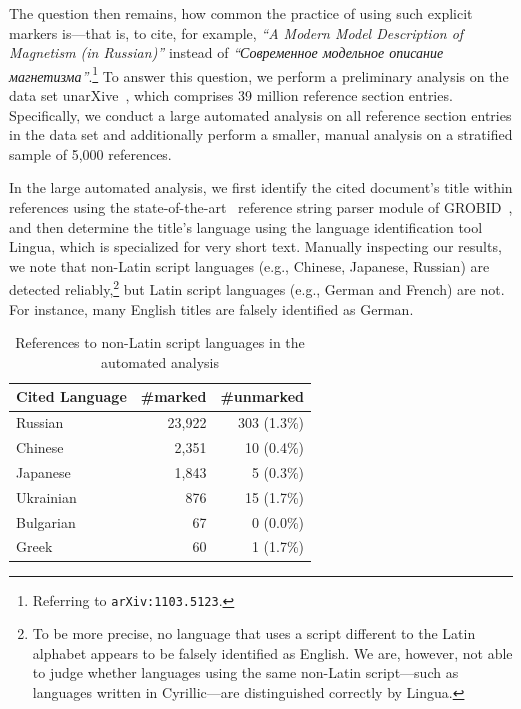 The question then remains, how common the practice of using such explicit markers is---that is, to cite, for example, \textit{``A Modern Model Description of Magnetism (in Russian)''} instead of \textit{``\foreignlanguage{russian}{Современное модельное описание магнетизма}''}.\footnote{Referring to \texttt{arXiv:1103.5123}.} To answer this question, we perform a preliminary analysis on the data set unarXive~\cite{Saier2020}, which comprises 39 million reference section entries. Specifically, we conduct a large automated analysis on all reference section entries in the data set and additionally perform a smaller, manual analysis on a stratified sample of 5,000 references.

In the large automated analysis, we first identify the cited document's title within references using the state-of-the-art~\cite{Tkaczyk2018} reference string parser module of GROBID~\cite{Lopez2009}, and then determine the title's language using the language identification tool Lingua, which is specialized for very short text.
Manually inspecting our results, we note that non-Latin script languages (e.g., Chinese, Japanese, Russian) are detected reliably,\footnote{To be more precise, no language that uses a script different to the Latin alphabet appears to be falsely identified as English. We are, however, not able to judge whether languages using the same non-Latin script---such as languages written in Cyrillic---are distinguished correctly by Lingua.} but Latin script languages (e.g., German and French) are not. For instance, many English titles are falsely identified as German.

\begin{table}
\caption{References to non-Latin script languages in the automated analysis}
 \label{tab:automatedresults}
  \centering
  \begin{small}
 \begin{threeparttable}
 \begin{tabular}{lrr}
 \toprule
   Cited Language & \#marked & \#unmarked \\
   \midrule
   Russian & 23,922 & 303 (1.3\%)\\
   Chinese & 2,351 & 10 (0.4\%) \\
   Japanese & 1,843 & 5 (0.3\%) \\
   Ukrainian & 876 & 15 (1.7\%)\\
   Bulgarian & 67 & 0 (0.0\%)\\
   Greek & 60 & 1 (1.7\%) \\
   \bottomrule
 \end{tabular}
\end{threeparttable}
  \end{small}
\end{table}

